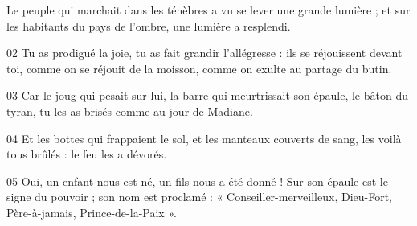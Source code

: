 Le peuple qui marchait dans les ténèbres a vu se lever une grande lumière ; et sur les habitants du pays de l’ombre, une lumière a resplendi.

02 Tu as prodigué la joie, tu as fait grandir l’allégresse : ils se réjouissent devant toi, comme on se réjouit de la moisson, comme on exulte au partage du butin.

03 Car le joug qui pesait sur lui, la barre qui meurtrissait son épaule, le bâton du tyran, tu les as brisés comme au jour de Madiane.

04 Et les bottes qui frappaient le sol, et les manteaux couverts de sang, les voilà tous brûlés : le feu les a dévorés.

05 Oui, un enfant nous est né, un fils nous a été donné ! Sur son épaule est le signe du pouvoir ; son nom est proclamé : « Conseiller-merveilleux, Dieu-Fort, Père-à-jamais, Prince-de-la-Paix ».